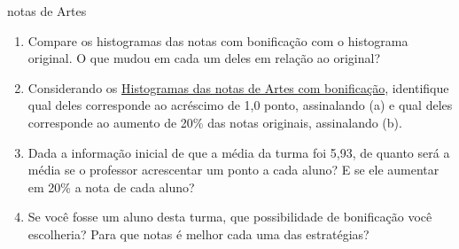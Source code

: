 \begin{task}{ notas de Artes}
\begin{enumerate}
\item {} 
Compare os histogramas das notas com bonificação com o histograma original. O que mudou em cada um deles em relação ao original?

\item {} 
Considerando os \hyperref[\detokenize{PE104-0:fig-histogramas-notas-aleteradas}]{Histogramas das notas de Artes com bonificação}, identifique qual deles corresponde ao  acréscimo de 1,0 ponto, assinalando (a) e qual deles corresponde ao aumento de 20\% das notas originais, assinalando (b).

\item {} 
Dada a informação inicial de que a média da turma foi 5,93, de quanto será a média se o professor acrescentar um ponto a cada aluno? E se ele aumentar em 20\% a nota de cada aluno?

\item {} 
Se você fosse um aluno desta turma, que possibilidade de bonificação você escolheria? Para que notas é melhor cada uma das estratégias?

\end{enumerate}
\end{task}


